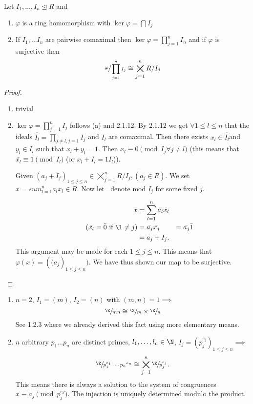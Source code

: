 \documentclass[master.tex]{subfiles}
\begin{document}
\begin{prop}
  Let \(I_1, \ldots, I_n \unlhd R\) and
  \begin{enumerate}[label=(\alph*)]
  \item \(\varphi\) is a ring homomorphism with \(\ker \varphi = \bigcap I_j\)
  \item If \(I_1, \ldots I_n\) are pairwise comaximal then \(\ker \varphi = \prod_{j=1}^n I_n\) and if \(\varphi\) is
    surjective then
    \[\sfrac{\varphi}{ \prod_{j=1}^n I_j} \cong \bigtimes_{j=1}^n R/I_j\]
  \end{enumerate}
\end{prop}

\begin{proof}
  \begin{enumerate}[label=(\alph*)]
  \item trivial
  \item \(\ker \varphi = \prod_{j=1}^n I_j\) follows (a) and 2.1.12.
    By 2.1.12 we get \(\forall 1 \le l \le n\) that the ideals \(\hat{I_l}=\prod_{j\neq l, j=1} I_j\) and \(I_l\) are
    comaximal. Then there exists \(x_l \in \hat{I_l}\)and \(y_l \in I_l\) such that \(x_l + y_l = 1\). Then \(x_l \equiv
    0 \pmod{I_j \forall j \neq l}\) (this means that \(\bar{x_l} \equiv 1 \pmod{I_l}\) (or \(x_l + I_l = 1 I_l\))).

    Given \((a_j + I_j)_{1 \le j \le n} \in \bigtimes_{j=1}^n{R/I_j}, (a_j \in R)\). We set \(x=sum_{l=1}^n{a_l x_l} \in
    R\). Now let \(\bar{\phantom{}}\) denote mod \(I_j\) for some fixed \(j\).

    \begin{align*}
      \bar{x} &= \sum_{l=1}^n \bar{a_l}\bar{x_l}\\ \tag{\(\bar{x_l}=\bar{0}\) if \(\l \neq j\)}
              &= \bar{a_j}\bar{x_j}
              &= \bar{a_j}\bar{1}\\
              &= a_j + I_j.
    \end{align*}
    This argument may be made for each \(1 \le j \le n\). This means that \(\varphi(x)=(\bar(a_j)_{1 \le j \le n})\). We
    have thus shown our map to be surjective.
  \end{enumerate}
\end{proof}
  \begin{example*}[Special Case \(R = \Z\)]
    \begin{enumerate}[label=(\alph*)]
    \item \(n=2\), \(I_1=(m)\), \(I_2=(n)\) with \((m,n)=1 \implies\)
      \[\sfrac{\Z}{mn} \cong \sfrac{\Z}{m} \times \sfrac{\Z}{n}\]
      See 1.2.3 where we already derived this fact using more elementary means.
    \item \(n\) arbitrary \(p_1 \ldots p_n\) are distinct primes, \(l_1, \ldots, l_n \in \N\), \(I_j = (p_j^{e_j})_{1
        \le j \le n} \implies\) \[\sfrac{\Z}{\primedecomposition{p}{e}{n}} \cong \bigtimes_{j=1}^n
        \sfrac{\Z}{p_j^{e_j}}.\]
      This means there is always a solution to the system of congruences \(x \equiv a_j \pmod{p_j^{ej}}\). The injection
      is uniquely determined modulo the product.
    \end{enumerate}
  \end{example*}
\end{document}
